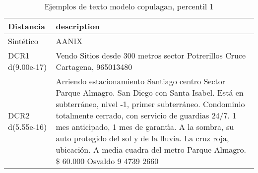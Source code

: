 \begin{table}[H]
\centering
\fontsize{10}{14}\selectfont
\caption{Ejemplos de texto modelo copulagan, percentil 1}
\label{table-example-economicos-b-1-copulagan-1p-text}
\begin{tabular}{|l|m{35em}|}
\hline
\rowcolor[gray]{0.8}
Distancia & description \\
\hline Sintético & AANIX \\
\hline DCR1 d(9.00e-17) & Vendo Sitios desde 300 metros sector Potrerillos Cruce Cartagena, 965013480 \\
\hline DCR2 d(5.55e-16) & Arriendo estacionamiento Santiago centro Sector Parque Almagro.
San Diego con Santa Isabel.
Est\'a en subterr\'aneo, nivel -1, primer subterr\'aneo.
Condominio totalmente cerrado, con servicio de guardias 24/7.
1 mes anticipado, 1 mes de garant{\'\i}a.
A la sombra, su auto protegido del sol y de la lluvia.
La cruz roja, ubicaci\'on.
A media cuadra del metro Parque Almagro.
\$ 60.000
Osvaldo
9 4739 2660
 \\
\hline
\end{tabular}
\end{table}
